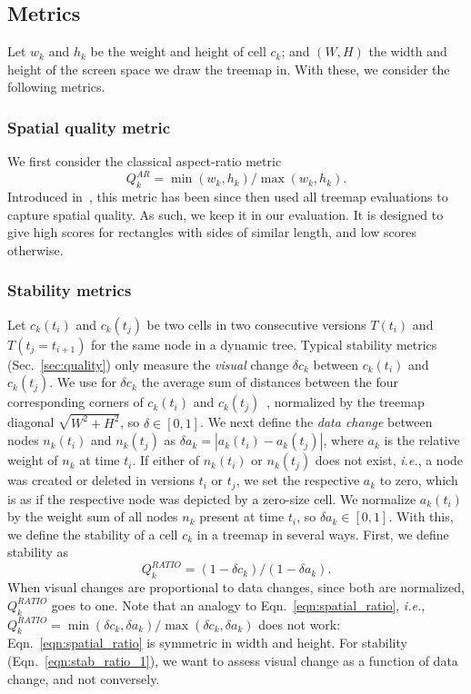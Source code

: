\subsection{Metrics}
\label{sec:mat_metrics}
%
Let $w_k$ and $h_k$ be the weight and height of cell $c_k$; and $(W,H)$ the width and height of the screen space we draw the treemap in. With these, we consider the following metrics.

\subsubsection{Spatial quality metric}
\label{sec:mat_met_spatial}
%
We first consider the classical aspect-ratio metric
%
\begin{equation}
Q^{AR}_k = \min(w_k,h_k)/\max(w_k,h_k).
\label{eqn:spatial_ratio}
\end{equation}
%
Introduced in~\cite{sqr}, this metric has been since then used all treemap evaluations to capture spatial quality. As such, we keep it in our evaluation. It is designed to give high scores for rectangles with sides of similar length, and low scores otherwise.
%

\subsubsection{Stability metrics}
\label{sec:mat_met_stab}
%
Let $c_k(t_i)$ and $c_k(t_j)$ be two cells in two consecutive versions $T(t_i)$ and $T(t_j=t_{i+1})$ for the same node in a dynamic tree. Typical stability metrics (Sec.~\ref{sec:quality}) only measure the \emph{visual} change $\delta c_k$ between $c_k(t_i)$ and $c_k(t_j)$. We use for $\delta c_k$ the average sum of distances between the four corresponding corners of $c_k(t_i)$ and $c_k(t_j)$~\citep{ordered}, normalized by the treemap diagonal $\sqrt{W^2+H^2}$, so $\delta \in [0,1]$. We next define the \emph{data change} between nodes $n_k(t_i)$ and $n_k(t_j)$ as $\delta a_k = |a_k(t_i)-a_k(t_j)|$, where $a_k$ is the relative weight of $n_k$ at time $t_i$. If either of $n_k(t_i)$ or $n_k(t_j)$ does not exist, \emph{i.e.}, a node was created or deleted in versions $t_i$ or $t_j$, we set the respective $a_k$ to zero, which is as if the respective node was depicted by a zero-size cell. We normalize $a_k(t_i)$ by the weight sum of all nodes $n_k$ present at time $t_i$, so $\delta a_k \in [0,1]$. With this, we define the stability of a cell $c_k$ in a treemap in several ways. First, we define stability as
%
\begin{equation}
Q^{RATIO}_k =  (1-\delta c_k) / (1 - \delta a_k).
\label{eqn:stab_ratio_1}
\end{equation}
%
When visual changes are proportional to data changes, since both are normalized, $Q^{RATIO}_k$ goes to one. Note that an analogy to Eqn.~\ref{eqn:spatial_ratio}, \emph{i.e.}, $Q^{RATIO}_k=\min(\delta c_k, \delta a_k)/\max(\delta c_k, \delta a_k)$ does not work: Eqn.~\ref{eqn:spatial_ratio} is symmetric in width and height. For stability (Eqn.~\ref{eqn:stab_ratio_1}), we want to assess visual change as a function of data change, and not conversely.


